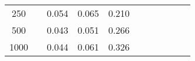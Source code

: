 % 
\begin{tabular}{ccccccccccc}
  \hline
  \hline
250 &  & 0.054 & 0.065 & 0.210 &  &  &  &  &  &  \\ 
  500 &  & 0.043 & 0.051 & 0.266 &  &  &  &  &  &  \\ 
  1000 &  & 0.044 & 0.061 & 0.326 &  &  &  &  &  &  \\ 
   \hline
\end{tabular}

